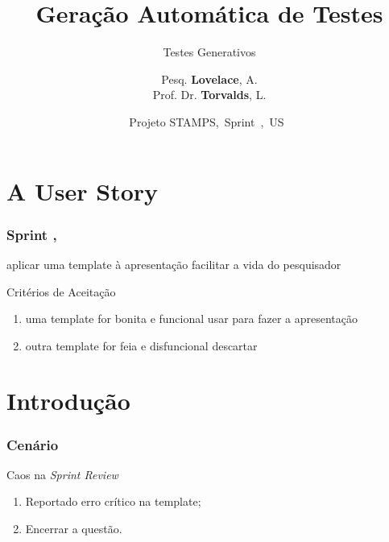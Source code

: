 \documentclass[usenames,dvipsnames]{gt-beamer}
\title{Geração Automática de Testes}
\subtitle{Testes Generativos}
\institute[ITA]
{
  \inst{1}Instituto Tecnológico de Aeronáutica - ITA
}
\author[ADA] {
    Pesq. \textbf{Lovelace}, A.\inst{1}\\
    Prof. Dr. \textbf{Torvalds}, L.\inst{1}
}
\date[\usDate]{Projeto STAMPS,~Sprint~\usSprint,~US~\usNumber}
\begin{document}
%
%
%
%
%
%
%



    \section{A User Story}

    \begin{frame}[allowframebreaks]
    	\frametitle{Sprint \usSprint, \usDate}

        \usStory
            {aplicar uma template à apresentação}
            {facilitar a vida do pesquisador}

        \begin{block}{Critérios de Aceitação}
            \begin{enumerate}
                \item
                    \usCriteria
                        {uma template}
                        {for bonita e funcional}
                        {usar para fazer a apresentação}
                \item
                    \usCriteria
                        {outra template}
                        {for feia e disfuncional}
                        {descartar}
            \end{enumerate}
        \end{block}

    \end{frame}

    \section{Introdução}

    \begin{frame}[allowframebreaks]
        \frametitle{Cenário}

        \begin{block}{Caos na \textit{Sprint Review}}
            \begin{enumerate}
                \item Reportado erro crítico na template;
                \item Encerrar a questão.
            \end{enumerate}
        \end{block}

    \end{frame}
\end{document}
